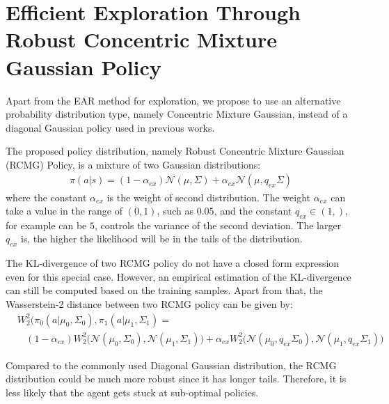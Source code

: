 \section{Efficient Exploration Through Robust Concentric Mixture Gaussian Policy}
Apart from the EAR method for exploration, we propose to use an alternative probability distribution type, namely Concentric Mixture Gaussian, instead of a diagonal Gaussian policy used in previous works.

The proposed policy distribution, namely Robust Concentric Mixture Gaussian (RCMG) Policy, is a mixture of two Gaussian distributions:
\begin{align}
\pi (a|s) = (1-\alpha_{ex})\mathcal{N}(\mu,\Sigma) + \alpha_{ex} \mathcal{N}(\mu,q_{ex}\Sigma)
\end{align}
where the constant $\alpha_{ex}$ is the weight of second distribution. The weight $\alpha_{ex}$ can take a value in the range of $(0,1)$, such as $0.05$, and the constant $q_{ex} \in (1,)$, for example can be $5$, controls the variance of the second deviation. The larger $q_{ex}$ is, the higher the likelihood will be in the tails of the distribution.

The KL-divergence of two RCMG policy do not have a closed form expression even for this special case. However, an empirical estimation of the KL-divergence can still be computed based on the training samples. Apart from that, the Wasserstein-2 distance between two RCMG policy can be given by:
\begin{align}&W_2^2(\pi_{0}(a|\mu_0,\Sigma_0), \pi_{1}(a|\mu_1,\Sigma_1) =  \\ \nonumber
& \ \ \ \ (1-\alpha_{ex})
W_2^2\big(\mathcal{N}(\mu_0,\Sigma_0), \mathcal{N}(\mu_1,\Sigma_1)\big)
+ \alpha_{ex} W_2^2\big(\mathcal{N}(\mu_0,q_{ex}\Sigma_0), \mathcal{N}(\mu_1,q_{ex}\Sigma_1)\big)
\end{align}


Compared to the commonly used Diagonal Gaussian distribution, the RCMG distribution could be much more robust since it has longer tails. Therefore, it is less likely that the agent gets stuck at sub-optimal policies.

